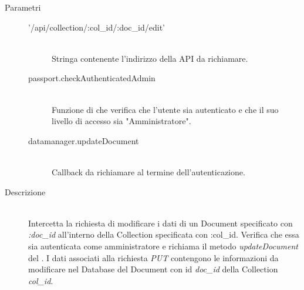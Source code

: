 \begin{description}
\begin{description}
\begin{mldescription}
   \hfill 
  \begin{description}
   \item[Parametri] \hfill 
    \begin{description}
     \item['/api/collection/:col\_id/:doc\_id/edit'] \hfill \\
     Stringa contenente l'indirizzo della API da richiamare.
     \item[passport.checkAuthenticatedAdmin] \hfill \\
     Funzione di  che verifica che l'utente sia autenticato e che il suo livello di accesso sia "Amministratore".
     \item[datamanager.updateDocument] \hfill \\
     Callback da richiamare al termine dell'autenticazione.
     \end{description}
   \item[Descrizione] \hfill \\ 
  Intercetta la richiesta di modificare i dati di un Document specificato con \textit{:doc\_id} all'interno della Collection specificata con :col\_id. Verifica che essa sia autenticata come amministratore e richiama il metodo \textit{updateDocument} del . I dati associati alla richiesta \textit{PUT} contengono le informazioni da modificare nel Database del Document con id \textit{doc\_id} della Collection \textit{col\_id}. 
  \end{description}
  

\end{mldescription}
\end{description}
\end{description}
